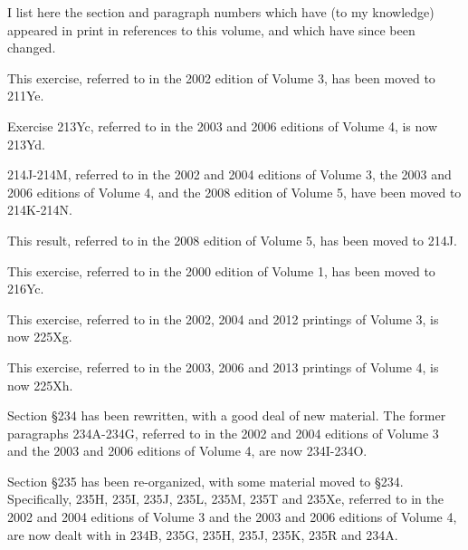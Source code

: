 \ifresultsonly\else
{}

\gdef\topparagraph{}
\gdef\bottomparagraph{}
\gdef\newparagraph{}

\def\chaptername{Concordance}
\def\sectionname{Concordance}

\newsection{}

I list here the section and paragraph numbers which have (to my 
knowledge) appeared in print in references to this volume, and which 
have since been changed.

\medskip

This exercise, referred to in the 2002 edition of Volume 3, has been
moved to 211Ye.

 Exercise 2{}13Yc, referred to in the
2003 and 2006 editions of Volume 4, is now 213Yd.   %

2{}14J-2{}14M, referred to in the 2002 and 2004
editions of Volume 3, the 2003 and 2006 editions of Volume 4, and the 2008
edition of Volume 5, have been moved to
214K-214N.  %

 This result, referred to in the
2008 edition of Volume 5, has been moved to 214J.

 This exercise, 
referred to in the 2000 edition of Volume 1, has been moved to 216Yc.

 This exercise, referred to in 
the 2002, 2004 and 2012 printings of Volume 3, is now 225Xg.

 This exercise, referred to in 
the 2003, 2006 and 2013 printings of Volume 4, is now 225Xh.

 Section \S2{}34 has been rewritten, with a good deal of
new material.   The former paragraphs 2{}34A-2{}34G, referred to in the
2002 and 2004 editions of Volume 3 and the 2003 and 2006 editions of
Volume 4, are now 234I-234O. %

 Section \S2{}35 has been re-organized, with
some material moved to \S2{}34.   Specifically, 
2{}35H, 2{}35I, 2{}35J, 2{}35L, 2{}35M, 2{}35T and 2{}35Xe, referred to in
the 2002 and 2004 editions of Volume 3 and the 2003 and 2006 editions of
Volume 4, are now dealt with in
234B, 235G, 235H, 235J, 235K, 235R and 234A.

